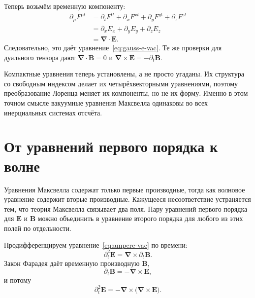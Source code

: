 Теперь возьмём временную компоненту:
\begin{align}
\partial_\mu F^{\mu t}
&=\partial_tF^{tt}
  +\partial_xF^{xt}
  +\partial_yF^{yt}
  +\partial_zF^{zt}\\
&=\partial_xE_x+\partial_yE_y+\partial_zE_z\\
&=\boldsymbol\nabla\cdot\mathbf E.
\end{align}
Следовательно, это даёт уравнение~\eqref{eq:gauss-e-vac}. Те же проверки для дуального тензора дают
\(\boldsymbol\nabla\cdot\mathbf B=0\) и
\(\boldsymbol\nabla\times\mathbf E=-\partial_t\mathbf B\).

Компактные уравнения теперь установлены, а не просто угаданы. Их структура со свободным индексом делает их четырёхвекторными уравнениями, поэтому преобразование Лоренца меняет их компоненты, но не их форму. Именно в этом точном смысле вакуумные уравнения Максвелла одинаковы во всех инерциальных системах отсчёта.

\section{От уравнений первого порядка к волне}

Уравнения Максвелла содержат только первые производные, тогда как волновое уравнение содержит вторые производные. Кажущееся несоответствие устраняется тем, что теория Максвелла связывает два поля. Пару уравнений первого порядка для \(\mathbf E\) и \(\mathbf B\) можно объединить в уравнение второго порядка для любого из этих полей по отдельности.

Продифференцируем уравнение~\eqref{eq:ampere-vac} по времени:
\begin{equation}
\partial_t^2\mathbf E
=\boldsymbol\nabla\times\partial_t\mathbf B.
\end{equation}
Закон Фарадея даёт временную производную \(\mathbf B\),
\begin{equation}
\partial_t\mathbf B=-\boldsymbol\nabla\times\mathbf E,
\end{equation}
и потому
\begin{equation}
\partial_t^2\mathbf E
=-\boldsymbol\nabla\times
  \bigl(\boldsymbol\nabla\times\mathbf E\bigr).
\label{eq:double-curl}
\end{equation}

